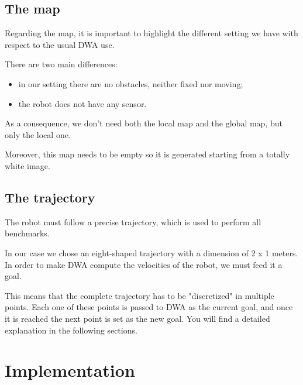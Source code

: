 \documentclass[11pt,a4paper]{article}
\begin{document}
\subsection{The map}

Regarding the map, it is important to highlight the different setting we have with respect to the usual DWA use.

There are two main differences:
\begin{itemize}
    \item in our setting there are no obstacles, neither fixed nor moving;
    \item the robot does not have any sensor.\\
\end{itemize}

As a consequence, we don't need both the local map and the global map, but only the local one.

Moreover, this map needs to be empty so it is generated starting from a totally white image.



\subsection{The trajectory}

The robot must follow a precise trajectory, which is used to perform all benchmarks.

In our case we chose an eight-shaped trajectory with a dimension of 2 x 1 meters.\\

In order to make DWA compute the velocities of the robot, we must feed it a goal.

This means that the complete trajectory has to be "discretized" in multiple points.
Each one of these points is passed to DWA as the current goal, and once it is reached the next point is set as the new goal. You will find a detailed explanation in the following sections.





\section{Implementation}
\end{document}
